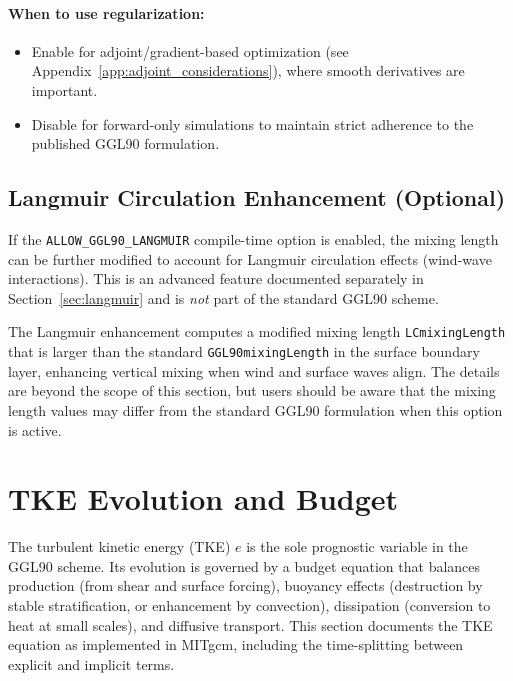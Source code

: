 \documentclass[12pt,letterpaper]{article}
\begin{document}
\paragraph{When to use regularization:}
\begin{itemize}
\item Enable for adjoint/gradient-based optimization (see Appendix~\ref{app:adjoint_considerations}), where smooth derivatives are important.
\item Disable for forward-only simulations to maintain strict adherence to the published GGL90 formulation.
\end{itemize}

\subsection{Langmuir Circulation Enhancement (Optional)}
\label{sec:mxl_langmuir}

If the \verb|ALLOW_GGL90_LANGMUIR| compile-time option is enabled, the mixing length can be further modified to account for Langmuir circulation effects (wind-wave interactions). This is an advanced feature documented separately in Section~\ref{sec:langmuir} and is \emph{not} part of the standard GGL90 scheme.

The Langmuir enhancement computes a modified mixing length \verb|LCmixingLength| that is larger than the standard \verb|GGL90mixingLength| in the surface boundary layer, enhancing vertical mixing when wind and surface waves align. The details are beyond the scope of this section, but users should be aware that the mixing length values may differ from the standard GGL90 formulation when this option is active.

\section{TKE Evolution and Budget}
\label{sec:tke_evolution}

The turbulent kinetic energy (TKE) $e$ is the sole prognostic variable in the GGL90 scheme. Its evolution is governed by a budget equation that balances production (from shear and surface forcing), buoyancy effects (destruction by stable stratification, or enhancement by convection), dissipation (conversion to heat at small scales), and diffusive transport. This section documents the TKE equation as implemented in MITgcm, including the time-splitting between explicit and implicit terms.
\end{document}

